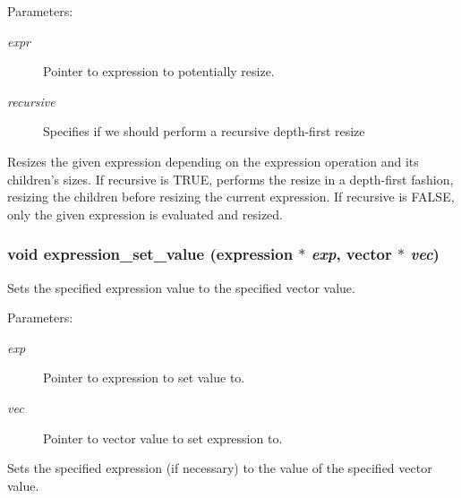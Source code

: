 \begin{Desc}
\item[Parameters:]
\begin{description}
\item[{\em expr}]Pointer to expression to potentially resize. \item[{\em recursive}]Specifies if we should perform a recursive depth-first resize\end{description}
\end{Desc}
Resizes the given expression depending on the expression operation and its children's sizes. If recursive is TRUE, performs the resize in a depth-first fashion, resizing the children before resizing the current expression. If recursive is FALSE, only the given expression is evaluated and resized. 
\subsubsection{\setlength{\rightskip}{0pt plus 5cm}void expression\_\-set\_\-value ({\bf expression} $\ast$ {\em exp}, {\bf vector} $\ast$ {\em vec})}\label{expr_8h_a2}


Sets the specified expression value to the specified vector value.

\begin{Desc}
\item[Parameters:]
\begin{description}
\item[{\em exp}]Pointer to expression to set value to. \item[{\em vec}]Pointer to vector value to set expression to.\end{description}
\end{Desc}
Sets the specified expression (if necessary) to the value of the specified vector value. 